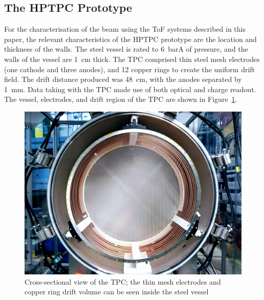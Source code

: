 \subsection{The HPTPC Prototype}
For the characterisation of the beam using the ToF systems described in this paper, the relevant characteristics of the HPTPC prototype are the location and thickness of the walls.
The steel vessel is rated to 6~barA of pressure, and the walls of the vessel are 1~cm thick.
The TPC comprised thin steel mesh electrodes (one cathode and three anodes), and 12 copper rings to create the uniform drift field.
The drift distance produced was 48~cm, with the anodes separated by 1~mm. Data taking with the TPC made use of both optical and charge readout.
The vessel, electrodes, and drift region of the TPC are shown in Figure~\ref{fig:TPC}.

\begin{figure}

  \centering
    \includegraphics[width=\linewidth]{files/Figures/IMG_20180830_170947192-3.jpg}
  \caption{Cross-sectional view of the TPC; the thin mesh electrodes and copper ring drift volume can be seen inside the steel vessel}
  
   \label{fig:TPC}
\end{figure}


